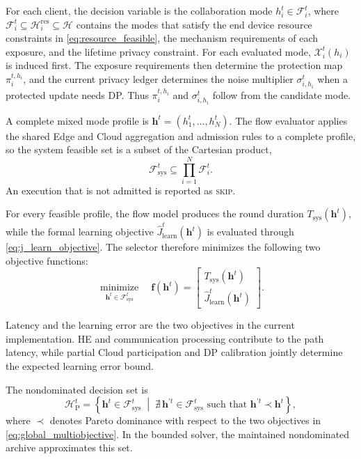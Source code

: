 \documentclass[5p,times]{elsarticle}
\theoremstyle{plain}
\theoremstyle{definition}
\theoremstyle{remark}
\begin{document}
For each client, the decision variable is the collaboration mode
\(h_i^t\in\mathcal F_i^t\), where
\(\mathcal F_i^t\subseteq\mathcal H_i^{\mathrm{res}}\subseteq\mathcal H\)
contains the modes that satisfy the end device resource constraints in
\eqref{eq:resource_feasible}, the mechanism requirements of each exposure,
and the lifetime privacy constraint. For each evaluated mode, \(\mathcal X_i^t(h_i)\) is induced first. The exposure requirements then determine the protection map \(\pi_i^{t,h_i}\), and the current privacy ledger determines the noise multiplier \(\sigma_{i,h_i}^t\) when a protected update needs DP. Thus \(\pi_i^{t,h_i}\) and \(\sigma_{i,h_i}^t\) follow from the candidate mode.

A complete mixed mode profile is \(\mathbf h^t=(h_1^t,\ldots,h_N^t)\). The flow evaluator applies the shared Edge and Cloud aggregation and admission rules to a complete profile, so the system feasible set is a subset of the Cartesian product,
\begin{equation}
\mathcal F_{\mathrm{sys}}^t
\subseteq
\prod_{i=1}^{N}\mathcal F_i^t.
\label{eq:global_feasible_set}
\end{equation}
An execution that is not admitted is reported as \textsc{skip}.

For every feasible profile, the flow model produces the round duration $T_{\mathrm{sys}}(\mathbf h^t)$, while the formal learning objective $\widehat J_{\mathrm{learn}}^t(\mathbf h^t)$ is evaluated through \eqref{eq:j_learn_objective}. The selector therefore minimizes the following two objective functions:
\begin{equation}
\underset{\mathbf h^t\in\mathcal F_{\mathrm{sys}}^t}
{\operatorname{minimize}}
\quad
\mathbf f(\mathbf h^t)
=
\begin{bmatrix}
T_{\mathrm{sys}}(\mathbf h^t)\\
\widehat J_{\mathrm{learn}}^t(\mathbf h^t)
\end{bmatrix}.
\label{eq:global_multiobjective}
\end{equation}

Latency and the learning error are the two objectives in the current implementation. HE and communication processing contribute to the path latency, while partial Cloud participation and DP calibration jointly determine the expected learning error bound.

The nondominated decision set is
\begin{equation}
\mathcal H_{\mathrm P}^t
=
\left\{
\mathbf h^t\in\mathcal F_{\mathrm{sys}}^t
\;\middle|\;
\nexists\,\mathbf h^{\prime t}\in\mathcal F_{\mathrm{sys}}^t
\text{ such that }
\mathbf h^{\prime t}\prec\mathbf h^t
\right\},
\label{eq:pareto_front}
\end{equation}
where \(\prec\) denotes Pareto dominance with respect to the two objectives in \eqref{eq:global_multiobjective}. In the bounded solver, the maintained nondominated archive approximates this set.
\end{document}
